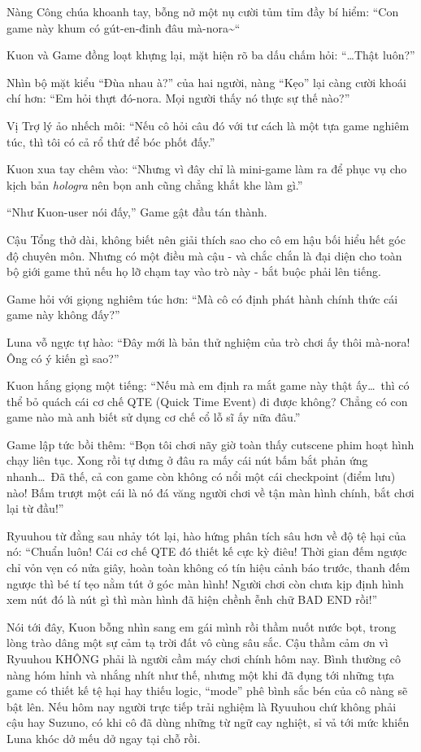 \documentclass[../main.tex]{subfiles}
\begin{document}
Nàng Công chúa khoanh tay, bỗng nở một nụ cười tủm tỉm đầy bí hiểm: ``Con game này khum có gút-en-đinh đâu mà-nora\~{}``

Kuon và Game đồng loạt khựng lại, mặt hiện rõ ba dấu chấm hỏi: ``\dots Thật luôn?''

Nhìn bộ mặt kiểu ``Đùa nhau à?'' của hai người, nàng ``Kẹo'' lại càng cười khoái chí hơn: ``Em hỏi thựt đó-nora. Mọi người thấy nó thực sự thế nào?''

Vị Trợ lý ảo nhếch môi: ``Nếu cô hỏi câu đó với tư cách là một tựa game nghiêm túc, thì tôi có cả rổ thứ để bóc phốt đấy.''

Kuon xua tay chêm vào: ``Nhưng vì đây chỉ là mini-game làm ra để phục vụ cho kịch bản \textit{hologra} nên bọn anh cũng chẳng khắt khe làm gì.''

``Như Kuon-user nói đấy,'' Game gật đầu tán thành.

Cậu Tổng thở dài, không biết nên giải thích sao cho cô em hậu bối hiểu hết góc độ chuyên môn. Nhưng có một điều mà cậu - và chắc chắn là đại diện cho toàn bộ giới game thủ nếu họ lỡ chạm tay vào trò này - bắt buộc phải lên tiếng.

Game hỏi với giọng nghiêm túc hơn: ``Mà cô có định phát hành chính thức cái game này không đấy?''

Luna vỗ ngực tự hào: ``Đây mới là bản thử nghiệm của trò chơi ấy thôi mà-nora! Ông có ý kiến gì sao?''

Kuon hắng giọng một tiếng: ``Nếu mà em định ra mắt game này thật ấy\dots\ thì có thể bỏ quách cái cơ chế QTE (Quick Time Event) đi được không? Chẳng có con game nào mà anh biết sử dụng cơ chế cổ lỗ sĩ ấy nữa đâu.''

Game lập tức bồi thêm: ``Bọn tôi chơi nãy giờ toàn thấy cutscene phim hoạt hình chạy liên tục. Xong rồi tự dưng ở đâu ra mấy cái nút bấm bắt phản ứng nhanh\dots\ Đã thế, cả con game còn không có nổi một cái checkpoint (điểm lưu) nào! Bấm trượt một cái là nó đá văng người chơi về tận màn hình chính, bắt chơi lại từ đầu!''

Ryuuhou từ đằng sau nhảy tót lại, hào hứng phân tích sâu hơn về độ tệ hại của nó: ``Chuẩn luôn! Cái cơ chế QTE đó thiết kế cực kỳ điêu! Thời gian đếm ngược chỉ vỏn vẹn có nửa giây, hoàn toàn không có tín hiệu cảnh báo trước, thanh đếm ngược thì bé tí tẹo nằm tút ở góc màn hình! Người chơi còn chưa kịp định hình xem nút đó là nút gì thì màn hình đã hiện chềnh ễnh chữ BAD END rồi!''

Nói tới đây, Kuon bỗng nhìn sang em gái mình rồi thầm nuốt nước bọt, trong lòng trào dâng một sự cảm tạ trời đất vô cùng sâu sắc. Cậu thầm cảm ơn vì Ryuuhou KHÔNG phải là người cầm máy chơi chính hôm nay. Bình thường cô nàng hóm hỉnh và nhắng nhít như thế, nhưng một khi đã đụng tới những tựa game có thiết kế tệ hại hay thiếu logic, ``mode'' phê bình sắc bén của cô nàng sẽ bật lên. Nếu hôm nay người trực tiếp trải nghiệm là Ryuuhou chứ không phải cậu hay Suzuno, có khi cô đã dùng những từ ngữ cay nghiệt, sỉ vả tới mức khiến Luna khóc dở mếu dở ngay tại chỗ rồi.
\end{document}
